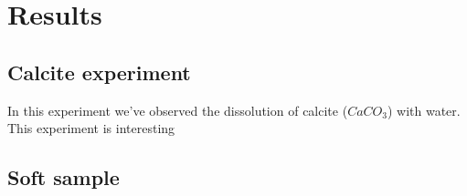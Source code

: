 \chapter{Results}


\section{Calcite experiment}

In this experiment we've observed the dissolution of calcite ($CaCO_3$) with water. This experiment is interesting

\section{Soft sample}